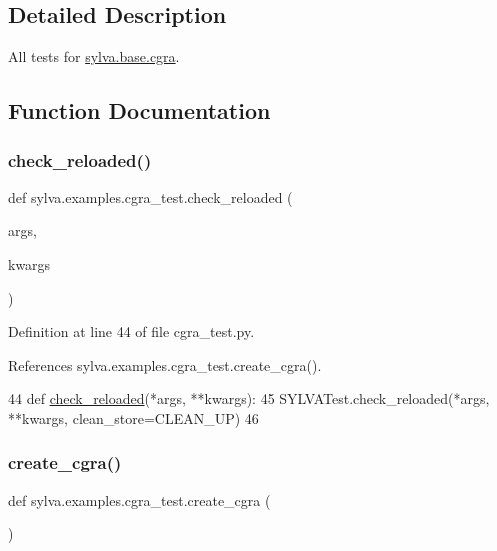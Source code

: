 \subsection{Detailed Description}
All tests for \hyperlink{namespacesylva_1_1base_1_1cgra}{sylva.\+base.\+cgra}. 

\subsection{Function Documentation}
\mbox{\label{namespacesylva_1_1examples_1_1cgra__test_a880e21c8ab7a79e7bb6d726fd3f8a584}} 
\subsubsection{\texorpdfstring{check\+\_\+reloaded()}{check\_reloaded()}}
{\footnotesize\ttfamily def sylva.\+examples.\+cgra\+\_\+test.\+check\+\_\+reloaded (\begin{DoxyParamCaption}\item[{}]{args,  }\item[{}]{kwargs }\end{DoxyParamCaption})}



Definition at line 44 of file cgra\+\_\+test.\+py.



References sylva.\+examples.\+cgra\+\_\+test.\+create\+\_\+cgra().


\begin{DoxyCode}
44     \textcolor{keyword}{def }\hyperlink{namespacesylva_1_1examples_1_1cgra__test_a880e21c8ab7a79e7bb6d726fd3f8a584}{check\_reloaded}(*args, **kwargs):
45         SYLVATest.check\_reloaded(*args, **kwargs, clean\_store=CLEAN\_UP)
46 
\end{DoxyCode}
\mbox{\label{namespacesylva_1_1examples_1_1cgra__test_a09c07ec774ca38d6416db7161605fff9}} 
\subsubsection{\texorpdfstring{create\+\_\+cgra()}{create\_cgra()}}
{\footnotesize\ttfamily def sylva.\+examples.\+cgra\+\_\+test.\+create\+\_\+cgra (\begin{DoxyParamCaption}{ }\end{DoxyParamCaption})}



